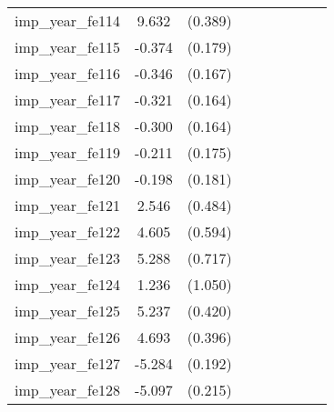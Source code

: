 {\begin{tabular}{l*{4}{cc}}
imp\_year\_fe114&    9.632\sym{***}&  (0.389)&                  &         &                  &         &                  &         \\
imp\_year\_fe115&   -0.374\sym{*}  &  (0.179)&                  &         &                  &         &                  &         \\
imp\_year\_fe116&   -0.346\sym{*}  &  (0.167)&                  &         &                  &         &                  &         \\
imp\_year\_fe117&   -0.321         &  (0.164)&                  &         &                  &         &                  &         \\
imp\_year\_fe118&   -0.300         &  (0.164)&                  &         &                  &         &                  &         \\
imp\_year\_fe119&   -0.211         &  (0.175)&                  &         &                  &         &                  &         \\
imp\_year\_fe120&   -0.198         &  (0.181)&                  &         &                  &         &                  &         \\
imp\_year\_fe121&    2.546\sym{***}&  (0.484)&                  &         &                  &         &                  &         \\
imp\_year\_fe122&    4.605\sym{***}&  (0.594)&                  &         &                  &         &                  &         \\
imp\_year\_fe123&    5.288\sym{***}&  (0.717)&                  &         &                  &         &                  &         \\
imp\_year\_fe124&    1.236         &  (1.050)&                  &         &                  &         &                  &         \\
imp\_year\_fe125&    5.237\sym{***}&  (0.420)&                  &         &                  &         &                  &         \\
imp\_year\_fe126&    4.693\sym{***}&  (0.396)&                  &         &                  &         &                  &         \\
imp\_year\_fe127&   -5.284\sym{***}&  (0.192)&                  &         &                  &         &                  &         \\
imp\_year\_fe128&   -5.097\sym{***}&  (0.215)&                  &         &                  &         &                  &         \\

\end{tabular}}
